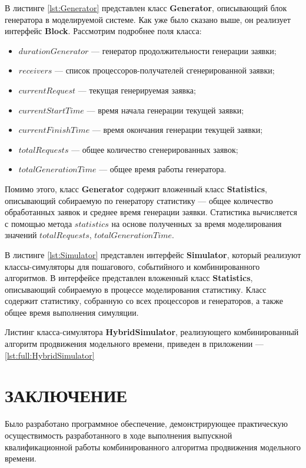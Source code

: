 \documentclass{bmstu}
\begin{document}
В листинге \ref{lst:Generator} представлен класс \textbf{Generator}, описывающий блок генератора в моделируемой системе. Как уже было сказано выше, он реализует интерфейс \textbf{Block}. Рассмотрим подробнее поля класса:
\begin{itemize}
	\item $durationGenerator$ --- генератор продолжительности генерации заявки;
	\item $receivers$ --- список процессоров-получателей сгенерированной заявки;
	\item $currentRequest$ --- текущая генерируемая заявка;
	\item $currentStartTime$ --- время начала генерации текущей заявки;
	\item $currentFinishTime$ --- время окончания генерации текущей заявки;
	\item $totalRequests$ --- общее количество сгенерированных заявок;
	\item $totalGenerationTime$ --- общее время работы генератора.
\end{itemize}
Помимо этого, класс \textbf{Generator} содержит вложенный класс \textbf{Statistics}, описывающий собираемую по генератору статистику --- общее количество обработанных заявок и среднее время генерации заявки. Статистика вычисляется с помощью метода $statistics$ на основе полученных за время моделирования значений $totalRequests$, $totalGenerationTime$.


В листинге \ref{lst:Simulator} представлен интерфейс \textbf{Simulator}, который реализуют классы-симуляторы для пошагового, событийного и комбинированного алгоритмов. В интерфейсе представлен вложенный класс \textbf{Statistics}, описывающий собираемую в процессе моделирования статистику. Класс содержит статистику, собранную со всех процессоров и генераторов, а также общее время выполнения симуляции.


Листинг класса-симулятора \textbf{HybridSimulator}, реализующего комбинированный алгоритм продвижения модельного времени, приведен в приложении --- \ref{lst:full:HybridSimulator} 

\chapter*{ЗАКЛЮЧЕНИЕ}
Было разработано программное обеспечение, демонстрирующее практическую осуществимость разработанного в ходе выполнения выпускной квалификационной работы комбинированного алгоритма продвижения модельного времени.


\makebibliography

\begin{appendices}
	\chapter{}
\end{appendices}
\end{document}
